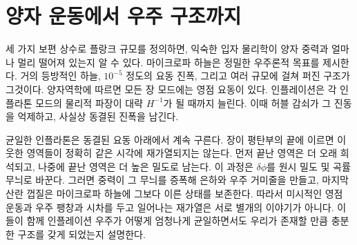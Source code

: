 \section{양자 운동에서 우주 구조까지}

세 가지 보편 상수로 플랑크 규모를 정의하면, 익숙한 입자 물리학이 양자 중력과 얼마나 멀리 떨어져 있는지 알 수 있다. 마이크로파 하늘은 정밀한 우주론적 목표를 제시한다. 거의 등방적인 하늘, \(10^{-5}\) 정도의 요동 진폭, 그리고 여러 규모에 걸쳐 퍼진 구조가 그것이다. 양자역학에 따르면 모든 장 모드에는 영점 요동이 있다. 인플레이션은 각 인플라톤 모드의 물리적 파장이 대략 \(H^{-1}\)가 될 때까지 늘린다. 이때 허블 감쇠가 그 진동을 억제하고, 사실상 동결된 진폭을 남긴다.

균일한 인플라톤은 동결된 요동 아래에서 계속 구른다. 장이 평탄부의 끝에 이르면 이웃한 영역들이 정확히 같은 시각에 재가열되지는 않는다. 먼저 끝난 영역은 더 오래 희석되고, 나중에 끝난 영역은 더 높은 밀도로 남는다. 이 과정은 \(\delta\phi\)를 원시 밀도 및 곡률 무늬로 바꾼다. 그러면 중력이 그 무늬를 증폭해 은하와 우주 거미줄을 만들고, 마지막 산란 껍질은 마이크로파 하늘에 그보다 이른 상태를 보존한다. 따라서 미시적인 영점 운동과 우주 팽창과 시차를 두고 일어나는 재가열은 서로 별개의 이야기가 아니다. 이들이 함께 인플레이션 우주가 어떻게 엄청나게 균일하면서도 우리가 존재할 만큼 충분한 구조를 갖게 되었는지 설명한다.
